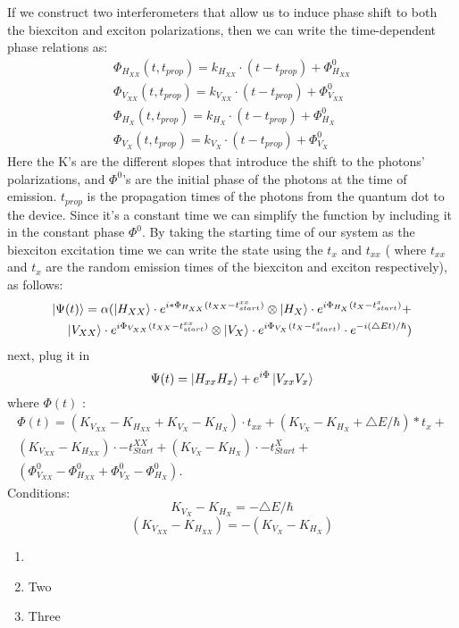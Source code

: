 If we construct two interferometers that allow us to induce phase shift to both the biexciton and exciton polarizations, then we can write the time-dependent phase relations as: 
\begin{equation}
\begin{aligned} 
		&\Phi_{H_{XX}}{(t,t_{prop})} = k_{H_{XX}}\cdot(t-t_{prop}) + \Phi^0_{H_{XX}} & \\	&\Phi_{V_{XX}}{(t,t_{prop})} = k_{V_{XX}}\cdot(t-t_{prop}) + \Phi^0_{V_{XX}} \\
        &\Phi_{H_{X}}{(t,t_{prop})} = k_{H_{X}}\cdot(t-t_{prop}) + \Phi^0_{H_{X}} &\\
		&\Phi_{V_{X}}{(t,t_{prop})} = k_{V_{X}}\cdot(t-t_{prop}) + \Phi^0_{V_{X}} 
\end{aligned}
\end{equation}
Here the  K's are the different slopes that introduce the shift to the photons' polarizations, and  $\Phi^0$'s are the initial phase of the photons at the time of emission. $t_{prop}$ is the propagation times of the photons from the quantum dot to the device. Since it's a constant time we can simplify the function by including it in the constant phase $\Phi^0$.
By taking the starting time of our system as the biexciton excitation time we can write the state using the $t_x$ and $t_{xx}$ ( where $t_{xx}$ and $t_{x}$ are the random emission times of the biexciton and exciton respectively), as follows:
\begin{equation}
\begin{split}
		\ket{\Psi(t)}= \alpha(\ket{H_{XX}}\cdot e^{i*\Phi_{H_{XX}}(t_{XX}-t^{xx}_{start})} \otimes 
		\ket{H_{X}}\cdot e^{i\Phi_{H_{X}}(t_{X}-t^{x}_{start})}+\\
        \ket{V_{XX}}\cdot e^{i\Phi_{V_{XX}}(t_{XX}-t^{xx}_{start})} \otimes 
		\ket{V_{X}}\cdot e^{i\Phi_{V_{X}}(t_{X}-t^{x}_{start})}\cdot e^{-i(\triangle Et)/\hslash})	
  \end{split}
\end{equation} 
next, plug it in
\begin{equation}
	\Psi(t) = \ket{H_{xx}H_x}+e^{i\Phi}\ket{V_{xx}V_x}
\end{equation}
where $\Phi(t)$ :
\begin{equation}
\begin{split}  
	\Phi(t) = (K_{V_{XX}}-K_{H_{XX}}+K_{V_X} - K_{H_X})\cdot t_{xx}+(K_{V_X}-K_{H_X} + \triangle E/\hbar)*t_x +\\
 (K_{V_{XX}} - K_{H_{XX}})\cdot-t^{XX}_{Start} +(K_{V_X}-K_{H_X})\cdot-t^X_{Start}+\\
 (\Phi^0_{V_{XX}}-\Phi^0_{H_{XX}}+\Phi^0_{V_{X}}-\Phi^0_{H_{X}}).
 \end{split}
\end{equation}
Conditions:
\begin{equation}
	K_{V_X}-K_{H_X} = -\triangle E/\hbar
\end{equation}
\begin{equation}
	(K_{V_{XX}} -K_{H_{XX}}) = -(K_{V_X}-K_{H_X})
\end{equation}
\begin{enumerate}
	\item 
	\item  Two
	\item  Three
\end{enumerate}
